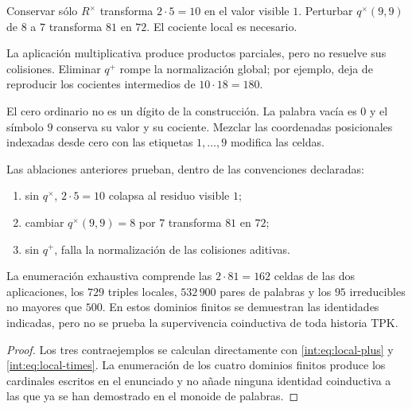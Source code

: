 \begin{definition}
Conservar sólo $R^\times$ transforma $2\cdot5=10$ en el valor visible $1$.
Perturbar $q^\times(9,9)$ de $8$ a $7$ transforma $81$ en $72$. El cociente
local es necesario.
\end{definition}

\begin{definition}
La aplicación multiplicativa produce productos parciales, pero no resuelve sus colisiones.
Eliminar $q^+$ rompe la normalización global; por ejemplo, deja de reproducir
los cocientes intermedios de $10\cdot18=180$.
\end{definition}

\begin{definition}
El cero ordinario no es un dígito de la construcción. La palabra vacía es
$0$ y el símbolo $9$ conserva su valor y su cociente. Mezclar las coordenadas
posicionales indexadas desde cero con las etiquetas $1,\ldots,9$ modifica las
celdas.
\end{definition}

\begin{proposition}
\label{int:pf84:D10}
Las ablaciones anteriores prueban, dentro de las convenciones declaradas:
\begin{enumerate}
  \item sin \(q^\times\), \(2\cdot5=10\) colapsa al residuo visible \(1\);
  \item cambiar \(q^\times(9,9)=8\) por \(7\) transforma \(81\) en \(72\);
  \item sin \(q^+\), falla la normalización de las colisiones aditivas.
\end{enumerate}
La enumeración exhaustiva comprende las \(2\cdot81=162\) celdas de las dos
aplicaciones, los \(729\) triples locales, \(532\,900\) pares de palabras y
los \(95\) irreducibles no mayores que \(500\). En estos dominios finitos se
demuestran las identidades indicadas, pero no se prueba la supervivencia
coinductiva de toda historia TPK.
\end{proposition}

\begin{proof}
Los tres contraejemplos se calculan directamente con
\eqref{int:eq:local-plus} y \eqref{int:eq:local-times}. La enumeración de los cuatro
dominios finitos produce los cardinales escritos en el enunciado y no añade
ninguna identidad coinductiva a las que ya se han demostrado en el monoide
de palabras.
\end{proof}

